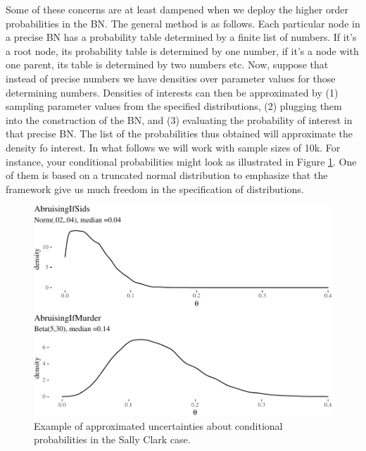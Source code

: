 \documentclass[
  10pt,
  dvipsnames,enabledeprecatedfontcommands]{scrartcl}
\begin{document}
Some of these concerns are at least dampened when we deploy the higher
order probabilities in the BN. The general method is as follows. Each
particular node in a precise BN has a probability table determined by a
finite list of numbers. If it's a root node, its probability table is
determined by one number, if it's a node with one parent, its table is
determined by two numbers etc. Now, suppose that instead of precise
numbers we have densities over parameter values for those determining
numbers. Densities of interests can then be approximated by (1) sampling
parameter values from the specified distributions, (2) plugging them
into the construction of the BN, and (3) evaluating the probability of
interest in that precise BN. The list of the probabilities thus obtained
will approximate the density fo interest. In what follows we will work
with sample sizes of 10k. For instance, your conditional probabilities
might look as illustrated in Figure \ref{fig:SCwithHOPa}. One of them is
based on a truncated normal distribution to emphasize that the framework
give us much freedom in the specification of distributions.

\begin{figure}

\begin{center}\includegraphics[width=0.9\linewidth]{chapter-outline_files/figure-latex/fig:SCwithHOPa-1} \end{center}

\caption{Example of approximated uncertainties about conditional probabilities in the Sally Clark case.}
\label{fig:SCwithHOPa}
\end{figure}
\end{document}
